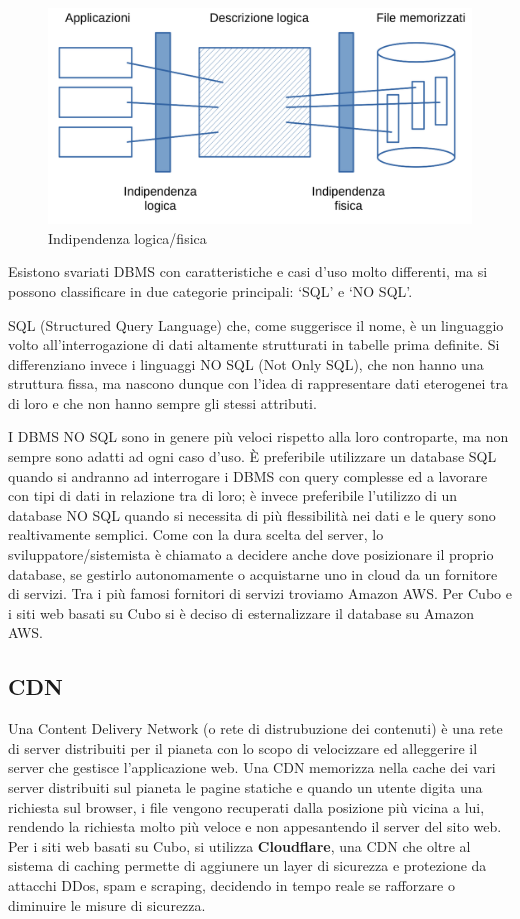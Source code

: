 \documentclass[12pt,a4paper]{article}
\begin{document}
\begin{figure}[H]
    \centering
    \includegraphics[width=.9\linewidth]{indipendenza_logica_fisica.png}
    \caption{Indipendenza logica/fisica}
\end{figure}

Esistono svariati DBMS con caratteristiche e casi d’uso molto differenti, ma si possono classificare in due categorie principali: ‘SQL’ e ‘NO SQL’.

SQL (Structured Query Language) che, come suggerisce il nome, è un linguaggio volto all’interrogazione di dati altamente strutturati in tabelle prima definite.
Si differenziano invece i linguaggi NO SQL (Not Only SQL), che non hanno una struttura fissa, ma nascono dunque con l’idea di rappresentare dati eterogenei tra di loro e che non hanno sempre gli stessi attributi.

I DBMS NO SQL sono in genere più veloci rispetto alla loro controparte, ma non sempre sono adatti ad ogni caso d’uso. È preferibile utilizzare un database SQL quando si andranno ad interrogare i DBMS con query complesse ed a lavorare con tipi di dati in relazione tra di loro; è invece preferibile l’utilizzo di un database NO SQL quando si necessita di più flessibilità nei dati e le query sono realtivamente semplici.
Come con la dura scelta del server, lo sviluppatore/sistemista è chiamato a decidere anche dove posizionare il proprio database, se gestirlo autonomamente o acquistarne uno in cloud da un fornitore di servizi. Tra i più famosi fornitori di servizi troviamo Amazon AWS. Per Cubo e i siti web basati su Cubo si è deciso di esternalizzare il database su Amazon AWS.

\subsection{CDN}
Una Content Delivery Network (o rete di distrubuzione dei contenuti) è una rete di server distribuiti per il pianeta con lo scopo di velocizzare ed alleggerire il server che gestisce l'applicazione web.
Una CDN memorizza nella cache dei vari server distribuiti sul pianeta le pagine statiche e quando un utente digita una richiesta sul browser, i file vengono recuperati dalla posizione più vicina a lui, rendendo la richiesta molto più veloce e non appesantendo il server del sito web.
Per i siti web basati su Cubo, si utilizza \textbf{Cloudflare}, una CDN che oltre al sistema di caching permette di aggiunere un layer di sicurezza e protezione da attacchi DDos, spam e scraping, decidendo in tempo reale se rafforzare o diminuire le misure di sicurezza.
\end{document}
